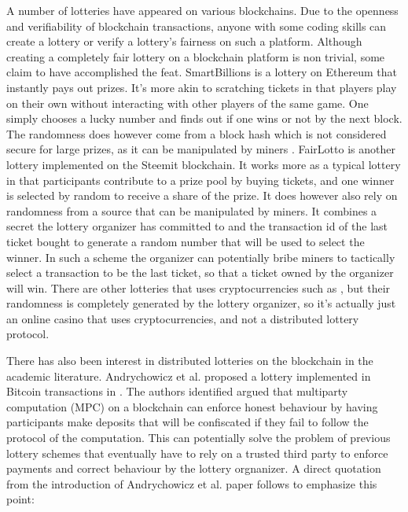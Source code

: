 A number of lotteries have appeared on various blockchains. Due to the openness and verifiability of blockchain transactions, anyone with some coding skills can create a lottery or verify a lottery's fairness on such a platform. Although creating a completely fair lottery on a blockchain platform is non trivial, some claim to have accomplished the feat. SmartBillions \cite{noauthor_smartbillions_nodate} is a lottery on Ethereum that instantly pays out prizes. It's more akin to scratching tickets in that players play on their own without interacting with other players of the same game. One simply chooses a lucky number and finds out if one wins or not by the next block. The randomness does however come from a block hash which is not considered secure for large prizes, as it can be manipulated by miners \cite{bonneau2015bitcoin} \cite{pierrot_malleability_2018}. 
FairLotto \cite{ago_fairlotto_2018} is another lottery implemented on the Steemit blockchain. It works more as a typical lottery in that participants contribute to a prize pool by buying tickets, and one winner is selected by random to receive a share of the prize. It does however also rely on randomness from a source that can be manipulated by miners. It combines a secret the lottery organizer has committed to and the transaction id of the last ticket bought to generate a random number that will be used to select the winner. In such a scheme the organizer can potentially bribe miners to tactically select a transaction to be the last ticket, so that a ticket owned by the organizer will win. 
There are other lotteries that uses cryptocurrencies such as \cite{noauthor_satoshi_nodate}, but their randomness is completely generated by the lottery organizer, so it's actually just an online casino that uses cryptocurrencies, and not a distributed lottery protocol.

There has also been interest in distributed lotteries on the blockchain in the academic literature. Andrychowicz et al. proposed a lottery implemented in Bitcoin transactions in \cite{andrychowicz_secure_2014}. The authors identified argued that multiparty computation (MPC) on a blockchain can enforce honest behaviour by having participants make deposits that will be confiscated if they fail to follow the protocol of the computation. This can potentially solve the problem of previous lottery schemes that eventually have to rely on a trusted third party to enforce payments and correct behaviour by the lottery orgnanizer. A direct quotation from the introduction of Andrychowicz et al. paper follows to emphasize this point:

